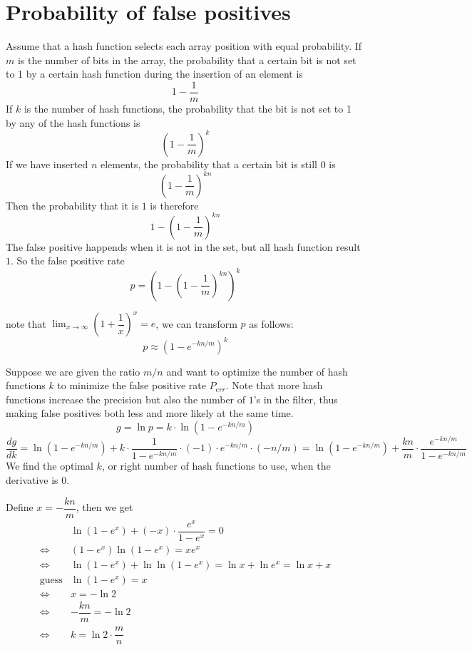 \section{Probability of false positives}
Assume that a hash function selects each array position with equal probability.
If $m$ is the number of bits in the array, the probability that a certain bit is not set to 1 by a certain hash function during the insertion of an element is $$1 - \dfrac{1}{m}$$
If $k$ is the number of hash functions, the probability that the bit is not set to 1 by any of the hash functions is $$(1 - \dfrac{1}{m})^k$$
If we have inserted $n$ elements, the probability that a certain bit is still $0$ is $$(1 - \dfrac{1}{m})^{kn}$$
Then the probability that it is $1$ is therefore $$1 - (1 - \dfrac{1}{m})^{kn}$$
The false positive happends when it is not in the set, but all hash function result $1$. So the false positive rate $$p = (1 - (1 - \dfrac{1}{m})^{kn})^k$$

note that $\lim_{x \to \infty}(1 + \dfrac{1}{x})^x = e$, we can transform $p$ as follows:
$$p \approx (1 - e^{-kn/m})^k$$

Suppose we are given the ratio $m/n$ and want to optimize the number of hash functions $k$ to minimize the false positive rate $P_{err}$.
Note that more hash functions increase the precision but also the number of $1$’s in the filter, thus making false positives both less and more likely at the same time.
$$g = \ln p = k \cdot \ln (1 - e^{-kn/m})$$
$$
\dfrac{dg}{dk}
= \ln (1 - e^{-kn/m}) + k \cdot \dfrac{1}{1 - e^{-kn/m}} \cdot (-1) \cdot e^{-kn/m}\cdot (-n/m)
= \ln (1 - e^{-kn/m}) + \dfrac{kn}{m} \cdot \dfrac{e^{-kn/m}}{1 - e^{-kn/m}}
$$
We find the optimal $k$, or right number of hash functions to use, when the derivative is $0$.

Define $x = - \dfrac{kn}{m}$, then we get
$$
\begin{aligned}
                    & \ln(1 - e^x) + (-x) \cdot \dfrac{e^x}{1 - e^x} = 0 \\
\Longleftrightarrow & (1 - e^x) \ln(1 - e^x) = x e^x \\
\Longleftrightarrow & \ln (1 - e^x) + \ln \ln(1 - e^x) = \ln x + \ln e^x = \ln x + x \\
\text{guess}        & \ln (1 - e^x) = x \\
\Longleftrightarrow & x = -\ln 2 \\
\Longleftrightarrow & - \dfrac{kn}{m} = -\ln 2 \\
\Longleftrightarrow & k = \ln 2 \cdot \dfrac{m}{n} \\
\end{aligned}
$$

